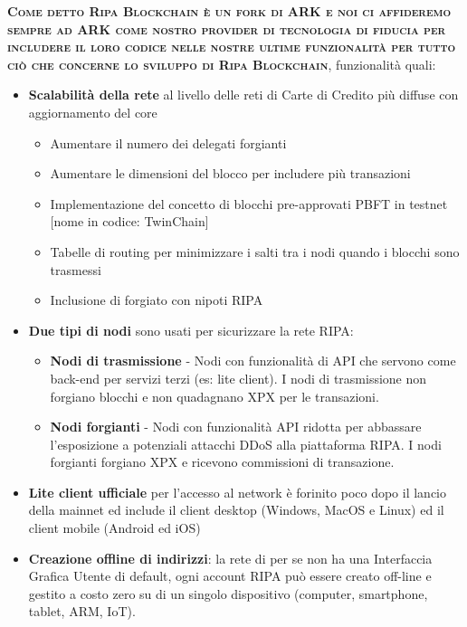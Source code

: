 \documentclass[11pt,fleqn]{book} %
\begin{document}
\vspace{5mm}
\textsc{\textbf{Come detto Ripa Blockchain è un fork di ARK e noi ci affideremo sempre ad ARK come nostro provider di tecnologia 
di fiducia per includere il loro codice nelle nostre ultime funzionalità per tutto ciò che concerne lo sviluppo di 
Ripa Blockchain}}, funzionalità quali:
\begin{itemize}
	\item \textbf{Scalabilità della rete} al livello delle reti di Carte di Credito più diffuse con aggiornamento del core
	\begin{itemize}
		\item Aumentare il numero dei delegati forgianti
		\item Aumentare le dimensioni del blocco per includere più transazioni
		\item Implementazione del concetto di blocchi pre-approvati PBFT in testnet [nome in codice: TwinChain]
		\item Tabelle di routing per minimizzare i salti tra i nodi quando i blocchi sono trasmessi
		\item Inclusione di forgiato con nipoti RIPA
	\end{itemize}
	\item \textbf{Due tipi di nodi} sono usati per sicurizzare la rete RIPA:
	\begin{itemize}
		\item \textbf{Nodi di trasmissione} - Nodi con funzionalità di API che servono come back-end per servizi terzi
		(es: lite client). I nodi di trasmissione non forgiano blocchi e non quadagnano XPX per le transazioni.
		\item \textbf{Nodi forgianti} - Nodi con funzionalità API ridotta per abbassare l'esposizione a potenziali
		attacchi DDoS alla piattaforma RIPA. I nodi forgianti forgiano XPX e ricevono commissioni di transazione.
	\end{itemize}
	\item \textbf{Lite client ufficiale} per l'accesso al network è forinito poco dopo il lancio della mainnet ed 
	include il client desktop (Windows, MacOS e Linux) ed il client mobile (Android ed iOS)
	\item \textbf{Creazione offline di indirizzi}: la rete di per se non ha una Interfaccia Grafica Utente di 
	default, ogni account RIPA può essere creato off-line e gestito a costo zero su di un singolo dispositivo
	(computer, smartphone, tablet, ARM, IoT).
\end{itemize}
\end{document}
